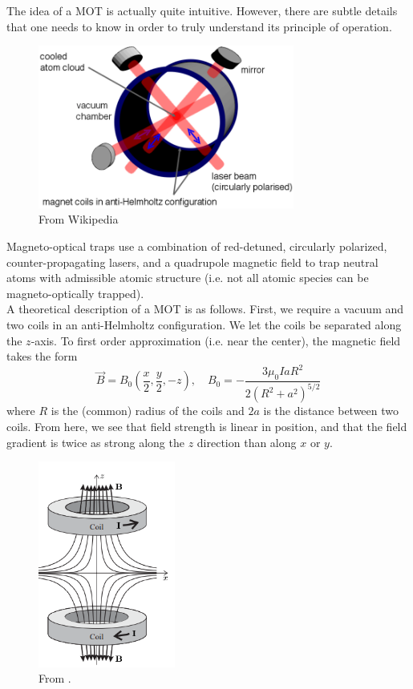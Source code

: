 \documentclass{book}
\theoremstyle{definition}
\newcommand{\f}[2]{\frac{#1}{#2}}
\newcommand{\lp}{\left(}
\newcommand{\rp}{\right)}
\begin{document}
The idea of a MOT is actually quite intuitive. However, there are subtle details that one needs to know in order to truly understand its principle of operation. 

\begin{figure}[!htb]
	\centering
	\includegraphics[width=0.75\textwidth]{images/MOT}
	\caption{From Wikipedia}
\end{figure}

Magneto-optical traps use a combination of red-detuned, circularly polarized, counter-propagating lasers, and a quadrupole magnetic field to trap neutral atoms with admissible atomic structure (i.e. not all atomic species can be magneto-optically trapped). \\


A theoretical description of a MOT is as follows. First, we require a vacuum and two coils in an anti-Helmholtz configuration. We let the coils be separated along the $z$-axis. To first order approximation (i.e. near the center), the magnetic field takes the form
\begin{equation*}
\vec{B} = B_0 \lp \f{x}{2}, \f{y}{2}, -z \rp, \quad B_0 = -\f{3\mu_0 I a R^2}{2(R^2 + a^2)^{5/2}}
\end{equation*}
where $R$ is the (common) radius of the coils and $2a$ is the distance between two coils. From here, we see that field strength is linear in position, and that the field gradient is twice as strong along the $z$ direction than along $x$ or $y$. 


\begin{figure}[!htb]
	\centering
	\includegraphics[width=0.4\textwidth]{images/anti-helmholtz}
	\caption{From \cite{foot2005atomic}.}
\end{figure}
\end{document}
